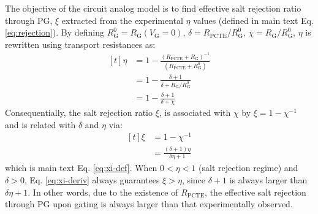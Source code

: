 \documentclass[journal=langd5,email=true, hyperref=true, keywords=false]{achemso}
\begin{document}
The objective of the circuit analog model is to find effective salt
rejection ratio through PG, $\xi$ extracted from the experimental
$\eta$ values (defined in main text Eq. \ref{eq:rejection}). By
defining $R_{\mathrm{G}}^{0}=R_{\mathrm{G}}(V_{\mathrm{G}}=0)$,
$\delta = R_{\mathrm{PCTE}} / R_{\mathrm{G}}^{0}$,
$\chi = R_{\mathrm{G}}/R_{\mathrm{G}}^{0}$, $\eta$ is rewritten using
transport resistances as:
\begin{equation}
  \begin{aligned}[t]
      \label{eq:eta-R}
  \eta &= 1 - {\displaystyle
    \frac{(R_{\mathrm{PCTE}} + R_{\mathrm{G}})^{-1}}
    {(R_{\mathrm{PCTE}} + R_{\mathrm{G}}^{0})}} \\
    &= 1 - \frac{\delta + 1}{\delta + R_{\mathrm{G}}/R_{\mathrm{G}}^{0}} \\
    &= 1 - \frac{\delta + 1}{\delta + \chi}
  \end{aligned}
\end{equation}
Consequentially, the
salt rejection ratio $\xi$, is associated with $\chi$ by
$\xi = 1 - \chi^{-1}$ and is related with $\delta$ and $\eta$ via:
\begin{equation}
  \label{eq:xi-deriv}
  \begin{aligned}[t]
    \xi &= 1 - \chi^{-1} \\
    &= \frac{(\delta + 1) \eta}{\delta\eta + 1}
  \end{aligned}
\end{equation}
which is main text Eq. \ref{eq:xi-def}. When $0<\eta<1$ (salt
rejection regime) and $\delta>0$, Eq. \ref{eq:xi-deriv} always
guarantees $\xi>\eta$, since $\delta + 1$ is always larger than
$\delta\eta + 1$. In other words, due to the existence of
$R_{\mathrm{PCTE}}$, the effective salt rejection through PG upon
gating is always larger than that experimentally observed.
\end{document}
